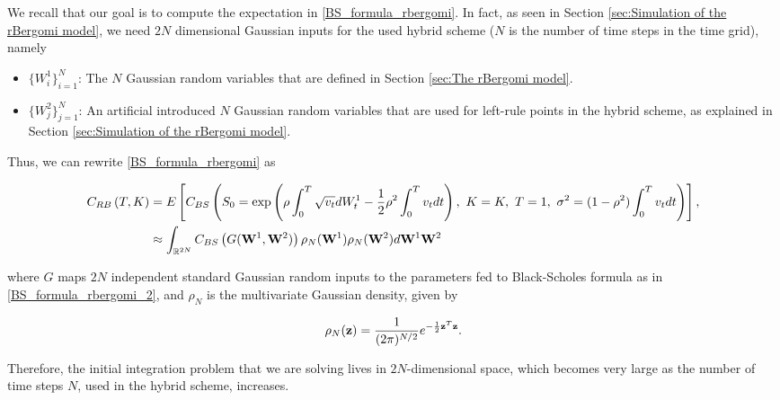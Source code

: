 We recall that our goal is to compute the expectation in \eqref{BS_formula_rbergomi}. In fact, as seen in Section \ref{sec:Simulation of the rBergomi model}, we need   $2N$ dimensional Gaussian inputs for the used  hybrid  scheme ($N$ is the number of time steps in  the time grid), namely
\begin{itemize}
	\item $\{W^1_i\}_{i=1}^N$: The $N$ Gaussian random variables that are defined in Section  \ref{sec:The rBergomi model}.
	\item $\{W^2_j\}_{j=1}^N$: An artificial introduced $N$ Gaussian random variables that are used for left-rule points in the hybrid scheme, as explained in Section  \ref{sec:Simulation of the rBergomi model}.
\end{itemize}

Thus, we can rewrite \eqref{BS_formula_rbergomi} as 


\begin{align}\label{BS_formula_rbergomi_2}
C_{RB}\left( T, K \right)&=E\left[C_{BS}\left( S_0 = \operatorname{exp}\left(\rho \int_0^T \sqrt{v_t} dW_t^1 - \frac{1}{2}
\rho^2 \int_0^T v_t dt\right),\ K = K, \ T = 1, \ \sigma^2 = (1-\rho^2)
\int_0^T v_t dt \right) \right], \nonumber \\
&\approx \int_{\mathbb{R}^{2N}} C_{BS} \left(G(\mathbf{W}^1,\mathbf{W}^2)\right) \rho_{N}(\mathbf{W}^1)  \rho_{N}(\mathbf{W}^2) d\mathbf{W}^1 \mathbf{W}^2
\end{align}

where $G$  maps  $2N$ independent standard Gaussian random inputs to the parameters fed to Black-Scholes formula as in \eqref{BS_formula_rbergomi_2}, and  $\rho_N$ is the multivariate Gaussian density, given by 

\begin{equation*}\label{eq: multivariate gaussian distribution}
\rho_N(\mathbf{z})=\frac{1}{(2 \pi)^{N/2}} e^{-\frac{1}{2} \mathbf{z}^T \mathbf{z}} .
\end{equation*} 

Therefore, the initial integration problem that we are solving lives in $2 N$-dimensional space, which becomes very large as the number of time steps $N$, used in the hybrid scheme, increases.


